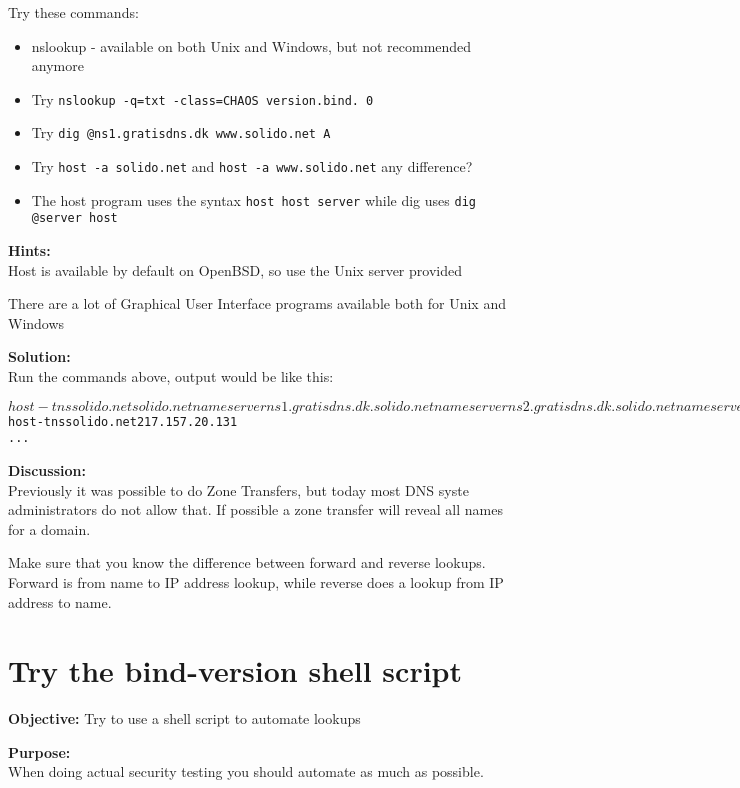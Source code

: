 \documentclass[a4paper,11pt,notitlepage]{report}
\begin{document}
Try these commands:
\begin{itemize}
\item nslookup - available on both Unix and Windows, but not recommended anymore
\item Try \verb+nslookup -q=txt -class=CHAOS version.bind. 0+
\item Try \verb+dig @ns1.gratisdns.dk www.solido.net A+
\item Try \verb+host -a solido.net+ and
\verb+host -a www.solido.net+ any difference?
\\
\item The host program uses the syntax \verb+host host server+ while dig uses \verb+dig @server host+
\end{itemize}

{\bf Hints:}\\
Host is available by default on OpenBSD, so use the Unix server provided

There are a lot of Graphical User Interface programs available both for Unix and Windows

{\bf Solution:}\\
Run the commands above, output would be like this:

\begin{alltt}
$ host -t ns solido.net
solido.net name server ns1.gratisdns.dk.
solido.net name server ns2.gratisdns.dk.
solido.net name server ns3.gratisdns.dk.
solido.net name server ns4.gratisdns.dk.
solido.net name server ns5.gratisdns.dk.
$ host -t ns solido.net 217.157.20.131
...
\end{alltt}


{\bf Discussion:}\\
Previously it was possible to do Zone Transfers, but today most DNS syste administrators do not allow that. If possible a zone transfer will reveal all names for a domain.

Make sure that you know the difference between forward and reverse lookups. Forward is from name to IP address lookup, while reverse does a lookup from IP address to name.


\chapter{Try the bind-version shell script}
\label{ex:bind-version-script}

{\bf Objective:}
Try to use a shell script to automate lookups

{\bf Purpose:}\\
When doing actual security testing you should automate as much as possible.
\end{document}
